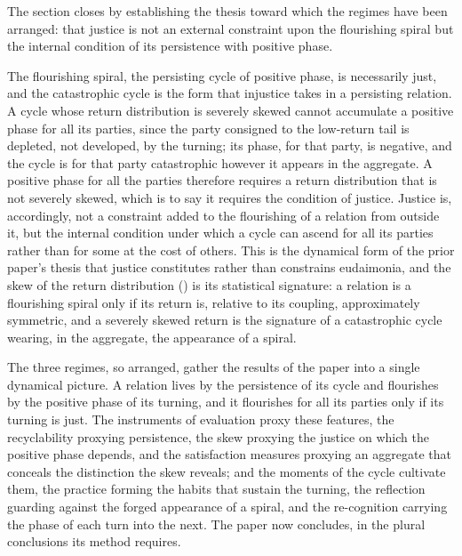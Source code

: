 The section closes by establishing the thesis toward which the regimes have been arranged: that justice is not an external constraint upon the flourishing spiral but the internal condition of its persistence with positive phase.

\begin{claim}
The flourishing spiral, the persisting cycle of positive phase, is necessarily just, and the catastrophic cycle is the form that injustice takes in a persisting relation. A cycle whose return distribution is severely skewed cannot accumulate a positive phase for all its parties, since the party consigned to the low-return tail is depleted, not developed, by the turning; its phase, for that party, is negative, and the cycle is for that party catastrophic however it appears in the aggregate. A positive phase for all the parties therefore requires a return distribution that is not severely skewed, which is to say it requires the condition of justice. Justice is, accordingly, not a constraint added to the flourishing of a relation from outside it, but the internal condition under which a cycle can ascend for all its parties rather than for some at the cost of others. This is the dynamical form of the prior paper's thesis that justice constitutes rather than constrains eudaimonia, and the skew of the return distribution () is its statistical signature: a relation is a flourishing spiral only if its return is, relative to its coupling, approximately symmetric, and a severely skewed return is the signature of a catastrophic cycle wearing, in the aggregate, the appearance of a spiral.
\end{claim}

\noindent
The three regimes, so arranged, gather the results of the paper into a single dynamical picture. A relation lives by the persistence of its cycle and flourishes by the positive phase of its turning, and it flourishes for all its parties only if its turning is just. The instruments of evaluation proxy these features, the recyclability proxying persistence, the skew proxying the justice on which the positive phase depends, and the satisfaction measures proxying an aggregate that conceals the distinction the skew reveals; and the moments of the cycle cultivate them, the practice forming the habits that sustain the turning, the reflection guarding against the forged appearance of a spiral, and the re-cognition carrying the phase of each turn into the next. The paper now concludes, in the plural conclusions its method requires.
